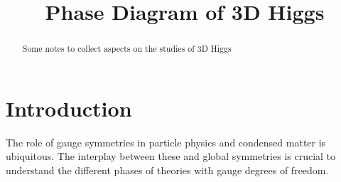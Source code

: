 \documentclass[]{scrartcl}
\title{Phase Diagram of 3D Higgs}
\date{}
\begin{document}
\maketitle

\begin{abstract}
Some notes to collect aspects on the studies of 3D Higgs 
\end{abstract}

\section{Introduction}
The role of gauge symmetries in particle physics and condensed matter is ubiquitous. The interplay between these and global symmetries is crucial to understand the different phases of theories with gauge degrees of freedom.  
\end{document}
